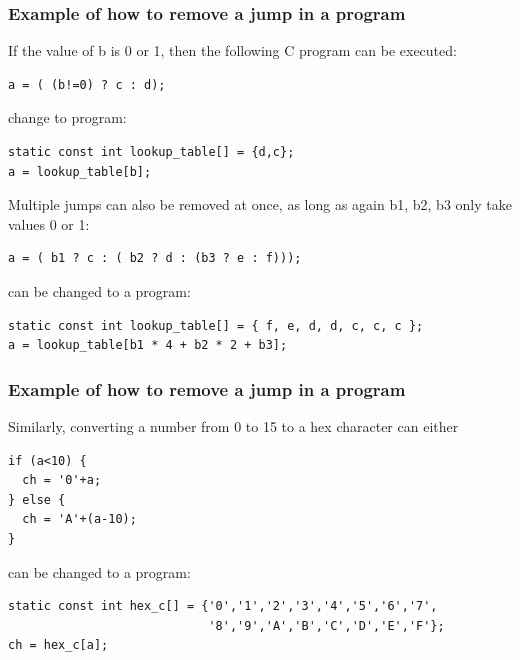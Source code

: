 \documentclass{beamer}
\begin{document}
\begin{frame}[fragile]
\frametitle{Example of how to remove a jump in a program}

If the value of b is 0 or 1, then the following C program can be executed:

\begin{verbatim}
a = ( (b!=0) ? c : d);
\end{verbatim}

change to program:

\begin{verbatim}
static const int lookup_table[] = {d,c};
a = lookup_table[b];
\end{verbatim}

\bigskip
Multiple jumps can also be removed at once, as long as again b1, b2, b3 only take values 0 or 1:

\begin{verbatim}
a = ( b1 ? c : ( b2 ? d : (b3 ? e : f)));
\end{verbatim}

can be changed to a program:

\begin{verbatim}
static const int lookup_table[] = { f, e, d, d, c, c, c };
a = lookup_table[b1 * 4 + b2 * 2 + b3];
\end{verbatim}
\end{frame}

\begin{frame}[fragile]
\frametitle{Example of how to remove a jump in a program}

Similarly, converting a number from 0 to 15 to a hex character can either
\begin{verbatim}
if (a<10) {
  ch = '0'+a;
} else {
  ch = 'A'+(a-10);
}
\end{verbatim}

can be changed to a program:

\begin{verbatim}
static const int hex_c[] = {'0','1','2','3','4','5','6','7',
                            '8','9','A','B','C','D','E','F'};
ch = hex_c[a];
\end{verbatim}
\end{frame}
\end{document}
